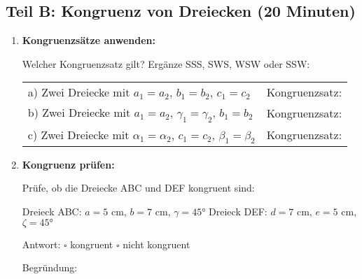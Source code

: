 \subsection*{Teil B: Kongruenz von Dreiecken (20 Minuten)}

\begin{enumerate}[label=\arabic*.,resume]

    \item \textbf{Kongruenzsätze anwenden:}

    Welcher Kongruenzsatz gilt? Ergänze SSS, SWS, WSW oder SSW:

    \vspace{0.5cm}
    \begin{tabular}{ll}
        a) Zwei Dreiecke mit $a_1 = a_2$, $b_1 = b_2$, $c_1 = c_2$ & Kongruenzsatz: \underline{\hspace{2cm}} \\[1cm]
        b) Zwei Dreiecke mit $a_1 = a_2$, $\gamma_1 = \gamma_2$, $b_1 = b_2$ & Kongruenzsatz: \underline{\hspace{2cm}} \\[1cm]
        c) Zwei Dreiecke mit $\alpha_1 = \alpha_2$, $c_1 = c_2$, $\beta_1 = \beta_2$ & Kongruenzsatz: \underline{\hspace{2cm}} \\[1cm]
    \end{tabular}

    \vspace{1cm}

    \item \textbf{Kongruenz prüfen:}

    Prüfe, ob die Dreiecke ABC und DEF kongruent sind:

    Dreieck ABC: $a = 5$ cm, $b = 7$ cm, $\gamma = 45°$
    Dreieck DEF: $d = 7$ cm, $e = 5$ cm, $\zeta = 45°$

    \vspace{2cm}

    Antwort: $\square$ kongruent \hspace{2cm} $\square$ nicht kongruent

    Begründung: \underline{\hspace{8cm}}

\end{enumerate}